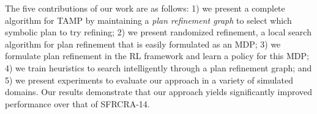 The five contributions of our work are as follows: 1) we present a complete algorithm for TAMP
by maintaining a \emph{plan refinement graph} to select which symbolic plan to try refining;
2) we present randomized refinement, a local search
algorithm for plan refinement that is easily formulated as an MDP; 3) we formulate plan refinement in the
RL framework and learn a policy for this MDP; 4) we train heuristics to search intelligently
through a plan refinement graph; and 5) we present experiments to evaluate our approach in a variety of simulated
domains. Our results demonstrate that our approach yields significantly improved
performance over that of SFRCRA-14.
